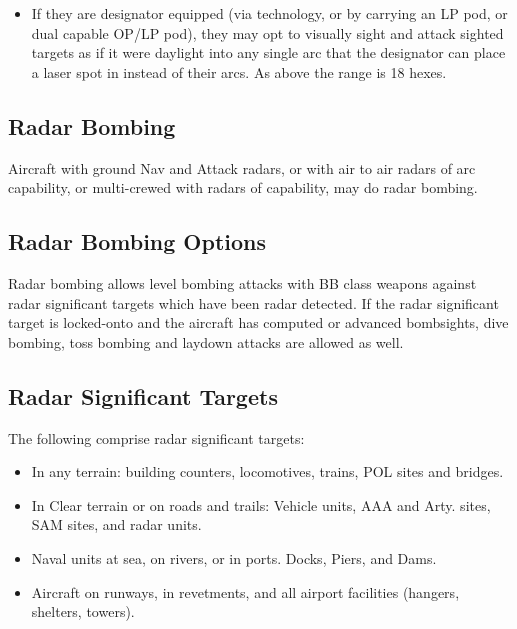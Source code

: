 \begin{advancedrules}
\begin{itemize}
        \item If they are designator equipped (via technology, or by carrying an LP pod, or dual capable OP/LP pod), they may opt to visually sight and attack sighted targets as if it were daylight into any single arc that the designator can place a laser spot in instead of their  arcs. As above the range is 18 hexes.

    \end{itemize}

    \subsection{Radar Bombing}

    Aircraft with ground Nav and Attack radars, or with air to air radars of  arc capability, or multi-crewed with radars of  capability, may do radar bombing.

    \subsection{Radar Bombing Options} Radar bombing allows level bombing attacks with BB class weapons against radar significant targets which have been radar detected. If the radar significant target is locked-onto and the aircraft has computed or advanced bombsights, dive bombing, toss bombing and laydown attacks are allowed as well.

    \subsection{Radar Significant Targets} The following comprise radar significant targets:

    \begin{itemize}

        \item In any terrain: building counters, locomotives, trains, POL sites and bridges.

        \item In Clear terrain or on roads and trails: Vehicle units, AAA and Arty. sites, SAM sites, and radar units.

        \item Naval units at sea, on rivers, or in ports. Docks, Piers, and Dams.

        \item Aircraft on runways, in revetments, and all airport facilities (hangers, shelters, towers).


\end{itemize}
\end{advancedrules}
